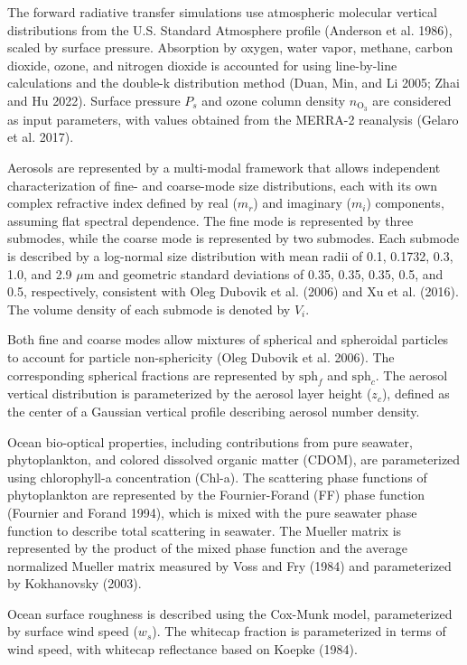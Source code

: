 \documentclass[
  11pt,
  letterpaper,
  DIV=11,
  numbers=noendperiod]{scrreprt}
\begin{document}
The forward radiative transfer simulations use atmospheric molecular
vertical distributions from the U.S. Standard Atmosphere profile
(Anderson et al. 1986), scaled by surface pressure. Absorption by
oxygen, water vapor, methane, carbon dioxide, ozone, and nitrogen
dioxide is accounted for using line-by-line calculations and the
double-k distribution method (Duan, Min, and Li 2005; Zhai and Hu 2022).
Surface pressure \(P_s\) and ozone column density \(n_{\mathrm{O}_3}\)
are considered as input parameters, with values obtained from the
MERRA-2 reanalysis (Gelaro et al. 2017).

Aerosols are represented by a multi-modal framework that allows
independent characterization of fine- and coarse-mode size
distributions, each with its own complex refractive index defined by
real (\(m_r\)) and imaginary (\(m_i\)) components, assuming flat
spectral dependence. The fine mode is represented by three submodes,
while the coarse mode is represented by two submodes. Each submode is
described by a log-normal size distribution with mean radii of 0.1,
0.1732, 0.3, 1.0, and 2.9 \(\mu\mathrm{m}\) and geometric standard
deviations of 0.35, 0.35, 0.35, 0.5, and 0.5, respectively, consistent
with Oleg Dubovik et al. (2006) and Xu et al. (2016). The volume density
of each submode is denoted by \(V_i\).

Both fine and coarse modes allow mixtures of spherical and spheroidal
particles to account for particle non-sphericity (Oleg Dubovik et al.
2006). The corresponding spherical fractions are represented by
\(\mathrm{sph}_f\) and \(\mathrm{sph}_c\). The aerosol vertical
distribution is parameterized by the aerosol layer height (\(z_c\)),
defined as the center of a Gaussian vertical profile describing aerosol
number density.

Ocean bio-optical properties, including contributions from pure
seawater, phytoplankton, and colored dissolved organic matter (CDOM),
are parameterized using chlorophyll-a concentration (Chl-a). The
scattering phase functions of phytoplankton are represented by the
Fournier-Forand (FF) phase function (Fournier and Forand 1994), which is
mixed with the pure seawater phase function to describe total scattering
in seawater. The Mueller matrix is represented by the product of the
mixed phase function and the average normalized Mueller matrix measured
by Voss and Fry (1984) and parameterized by Kokhanovsky (2003).

Ocean surface roughness is described using the Cox-Munk model,
parameterized by surface wind speed (\(w_s\)). The whitecap fraction is
parameterized in terms of wind speed, with whitecap reflectance based on
Koepke (1984).
\end{document}
